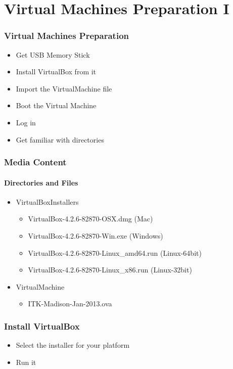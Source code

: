 \section{Virtual Machines Preparation I}


\begin{frame}
\frametitle{Virtual Machines Preparation}
\begin{itemize}
\item Get USB Memory Stick
\item Install VirtualBox from it
\item Import the VirtualMachine file
\item Boot the Virtual Machine
\item Log in
\item Get familiar with directories
\end{itemize}
\end{frame}


\begin{frame}
\frametitle{Media Content}
\framesubtitle{Directories and Files}
\begin{itemize}
\item VirtualBoxInstallers
\begin{itemize}
\item VirtualBox-4.2.6-82870-OSX.dmg (Mac)
\item VirtualBox-4.2.6-82870-Win.exe (Windows)
\item VirtualBox-4.2.6-82870-Linux\_amd64.run (Linux-64bit)
\item VirtualBox-4.2.6-82870-Linux\_x86.run (Linux-32bit)
\end{itemize}
\pause
\item VirtualMachine
\begin{itemize}
\item  ITK-Madison-Jan-2013.ova
\end{itemize}
\end{itemize}
\end{frame}

\begin{frame}
\frametitle{Install VirtualBox}
\begin{itemize}
\item Select the installer for your platform
\item Run it
\end{itemize}
\end{frame}

